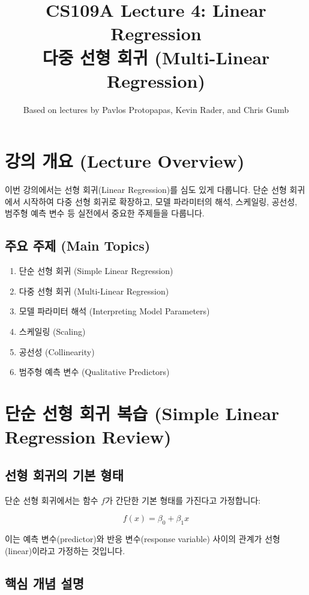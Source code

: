 \documentclass[12pt]{article}
\title{CS109A Lecture 4: Linear Regression\\다중 선형 회귀 (Multi-Linear Regression)}
\author{Based on lectures by Pavlos Protopapas, Kevin Rader, and Chris Gumb}
\date{}
\begin{document}
\maketitle
\tableofcontents
\newpage

\section{강의 개요 (Lecture Overview)}

이번 강의에서는 선형 회귀(Linear Regression)를 심도 있게 다룹니다. 단순 선형 회귀에서 시작하여 다중 선형 회귀로 확장하고, 모델 파라미터의 해석, 스케일링, 공선성, 범주형 예측 변수 등 실전에서 중요한 주제들을 다룹니다.

\subsection{주요 주제 (Main Topics)}
\begin{enumerate}
    \item 단순 선형 회귀 (Simple Linear Regression)
    \item 다중 선형 회귀 (Multi-Linear Regression)
    \item 모델 파라미터 해석 (Interpreting Model Parameters)
    \item 스케일링 (Scaling)
    \item 공선성 (Collinearity)
    \item 범주형 예측 변수 (Qualitative Predictors)
\end{enumerate}

\section{단순 선형 회귀 복습 (Simple Linear Regression Review)}

\subsection{선형 회귀의 기본 형태}

단순 선형 회귀에서는 함수 $f$가 간단한 기본 형태를 가진다고 가정합니다:

\begin{equation}
f(x) = \beta_0 + \beta_1 x
\end{equation}

이는 예측 변수(predictor)와 반응 변수(response variable) 사이의 관계가 선형(linear)이라고 가정하는 것입니다.

\subsection{핵심 개념 설명}
\end{document}
